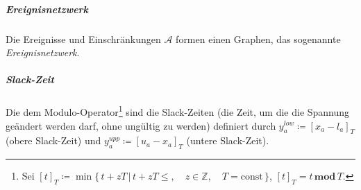 \documentclass[accentcolor = tud11b, a4paper, 11pt, tudmathserif]{tudexercise}
\newcommand{\const}{\ensuremath{\textrm{const}}}
\newcommand{\Z}{\ensuremath{\mathbb{Z}}}
\begin{document}
		\subparagraph{Ereignisnetzwerk}
		Die Ereignisse und Einschränkungen \( \mathcal{A} \) formen einen Graphen, das sogenannte \emph{Ereignisnetzwerk}.
		
		\subparagraph{Slack-Zeit}
		Die dem Modulo-Operator\footnote{Sei \( [t]_T \coloneqq \min \{\, t + zT \,\vert\, t + zT \leq,\quad z \in \Z,\quad T = \const \,\} \), \dh \( [t]_T = t \,\mathbf{mod}\, T \).} sind die Slack-Zeiten (die Zeit, um die die Spannung geändert werden darf, ohne ungültig zu werden) definiert durch \( y_a^\mathit{low} \coloneqq [x_a - l_a]_T \) (obere Slack-Zeit) und \( y_a^\mathit{upp} \coloneqq [u_a - x_a]_T \) (untere Slack-Zeit).
\end{document}
